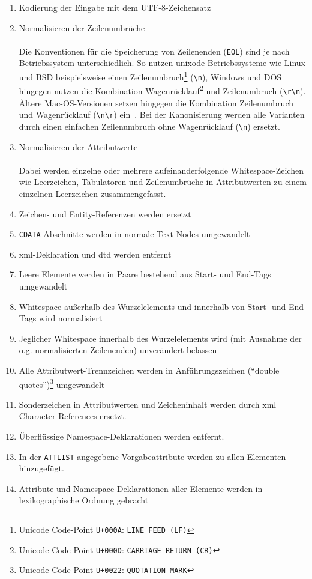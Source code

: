 \begin{enumerate}
    \item{} {Kodierung der Eingabe mit dem UTF-8-Zeichensatz}
    \item{} {Normalisieren der Zeilenumbrüche}\\\\
        Die Konventionen für die Speicherung von Zeilenenden (\texttt{EOL})
        sind je nach Betriebssystem unterschiedlich. So nutzen unixode
        Betriebssysteme wie Linux und BSD beispielsweise einen
        Zeilenumbruch\footnote{Unicode Code-Point \texttt{U+000A}:
        \texttt{LINE FEED (LF)}} (\texttt{{\textbackslash}n}), Windows und DOS hingegen
        nutzen die Kombination Wagenrücklauf\footnote{Unicode Code-Point
        \texttt{U+000D}: \texttt{CARRIAGE RETURN (CR)}} und Zeilenumbruch
        (\texttt{{\textbackslash}r{\textbackslash}n}). Ältere Mac-OS-Versionen setzen hingegen die
        Kombination Zeilenumbruch und Wagenrücklauf (\texttt{{\textbackslash}n{\textbackslash}r})
        ein~\cite[S.~212]{unicode9}.
        Bei der Kanonisierung werden alle Varianten durch einen einfachen
        Zeilenumbruch ohne Wagenrücklauf (\texttt{{\textbackslash}n}) ersetzt.
    \item{} {Normalisieren der Attributwerte}\\\\
        Dabei werden einzelne oder mehrere aufeinanderfolgende Whitespace-Zeichen wie Leerzeichen, Tabulatoren und Zeilenumbrüche in Attributwerten zu einem einzelnen Leerzeichen zusammengefasst.
    \item{} {Zeichen- und Entity-Referenzen werden ersetzt}
    \item{} \texttt{CDATA}-Abschnitte werden in normale Text-Nodes umgewandelt
    \item{} \acrshort{xml}-Deklaration und \gls{dtd} werden entfernt
    \item{} Leere Elemente werden in Paare bestehend aus Start- und End-Tags umgewandelt
    \item{} Whitespace außerhalb des Wurzelelements und innerhalb von Start- und End-Tags wird normalisiert
    \item{} Jeglicher Whitespace innerhalb des Wurzelelements wird (mit Ausnahme der o.g. normalisierten Zeilenenden) unverändert belassen
    \item{} Alle Attributwert-Trennzeichen werden in Anführungszeichen (\enquote{double quotes})\footnote{Unicode Code-Point \texttt{U+0022}: \texttt{QUOTATION MARK}} umgewandelt
    \item{} Sonderzeichen in Attributwerten und Zeicheninhalt werden durch \acrshort{xml} Character References ersetzt.
    \item{} Überflüssige Namespace-Deklarationen werden entfernt.
    \item{} In der \texttt{ATTLIST} angegebene Vorgabeattribute werden zu allen Elementen hinzugefügt.
    \item{} Attribute und Namespace-Deklarationen aller Elemente werden in lexikographische Ordnung gebracht
\end{enumerate}

